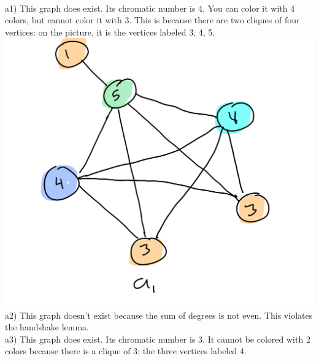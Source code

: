 \documentclass{article}
\begin{document}
\newpage
\begin{solution} 
	\\
	a1)  This graph does exist. Its chromatic number is 4. You can color it with 4 colors, but cannot color it with 3. This is because there are two cliques of four vertices: on the picture, it is the vertices labeled 3, 4, 5.
	\\ \includegraphics[scale=0.4]{a1.png}
	\\
	a2) This graph doesn't exist because the sum of degrees is not even. This violates the handshake lemma.
	\\
	a3) This graph does exist. Its chromatic number is 3. It cannot be colored with 2 colors because there is a clique of 3: the three vertices labeled 4.

\end{solution}
\end{document}
